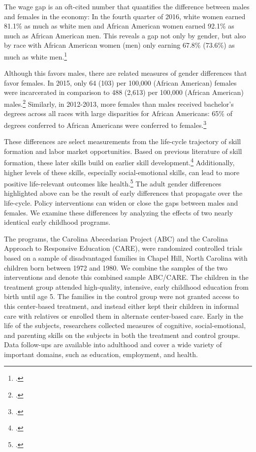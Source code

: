 The wage gap is an oft-cited number that quantifies the difference between males and females in the economy: In the fourth quarter of 2016, white women earned 81.1\% as much as white men and African American women earned 92.1\% as much as African American men. This reveals a gap not only by gender, but also by race with African American women (men) only earning 67.8\% (73.6\%) as much as white men.\footnote{\citet{USDPTL_2017_Wage_News-Release}.}

 Although this favors males, there are related measures of gender differences that favor females. In 2015, only 64 (103) per 100,000 (African American) females were incarcerated in comparison to 488 (2,613) per 100,000 (African American) males.\footnote{\citet{UDOJ_2016_PrisonersStatistics_Bulletin}.} Similarly, in 2012-2013, more females than males received bachelor's degrees across all races with large disparities for African Americans: 65\% of degrees conferred to African Americans were conferred to females.\footnote{\citet{UDOE_2016_Statistics_Report}.}

These differences are select measurements from the life-cycle trajectory of skill formation and labor market opportunities. Based on previous literature of skill formation, these later skills build on earlier skill development.\footnote{\citet{Cunha_Heckman_2008_JHR,Cunha_Heckman_etal_2010_est_tech_cognoncog}.} Additionally, higher levels of these skills, especially social-emotional skills, can lead to more positive life-relevant outcomes like health.\footnote{\citet{Heckman_2008_EI,Heckman_Pinto_etal_2013_PerryFactor,Conti_etal_2016_LongTermHealth}.} The adult gender differences highlighted above can be the result of early differences that propagate over the life-cycle. Policy interventions can widen or close the gaps between males and females. We examine these differences by analyzing the effects of two nearly identical early childhood programs. 

The programs, the Carolina Abecedarian Project (ABC) and the Carolina Approach to Responsive Education (CARE), were randomized controlled trials based on a sample of disadvantaged families in Chapel Hill, North Carolina with children born between 1972 and 1980. We combine the samples of the two interventions and denote this combined sample ABC/CARE. The children in the treatment group attended high-quality, intensive, early childhood education from birth until age 5. The families in the control group were not granted access to this center-based treatment, and instead either kept their children in informal care with relatives or enrolled them in alternate center-based care. Early in the life of the subjects, researchers collected measures of cognitive, social-emotional, and parenting skills on the subjects in both the treatment and control groups. Data follow-ups are available into adulthood and cover a wide variety of important domains, such as education, employment, and health.

